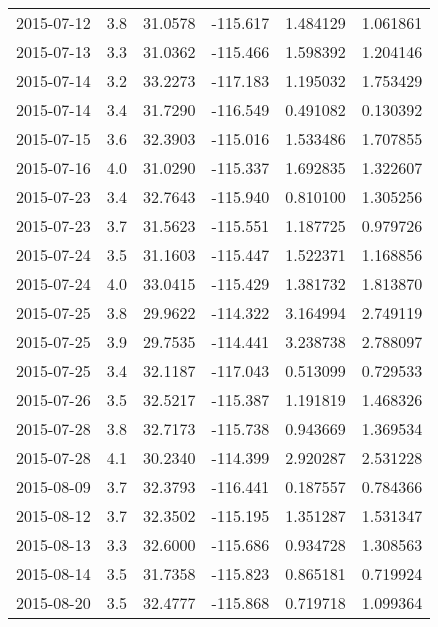 \begin{tabular}{lrrrrr}
2015-07-12 &       3.8 &  31.0578 &  -115.617 &         1.484129 &         1.061861 \\
2015-07-13 &       3.3 &  31.0362 &  -115.466 &         1.598392 &         1.204146 \\
2015-07-14 &       3.2 &  33.2273 &  -117.183 &         1.195032 &         1.753429 \\
2015-07-14 &       3.4 &  31.7290 &  -116.549 &         0.491082 &         0.130392 \\
2015-07-15 &       3.6 &  32.3903 &  -115.016 &         1.533486 &         1.707855 \\
2015-07-16 &       4.0 &  31.0290 &  -115.337 &         1.692835 &         1.322607 \\
2015-07-23 &       3.4 &  32.7643 &  -115.940 &         0.810100 &         1.305256 \\
2015-07-23 &       3.7 &  31.5623 &  -115.551 &         1.187725 &         0.979726 \\
2015-07-24 &       3.5 &  31.1603 &  -115.447 &         1.522371 &         1.168856 \\
2015-07-24 &       4.0 &  33.0415 &  -115.429 &         1.381732 &         1.813870 \\
2015-07-25 &       3.8 &  29.9622 &  -114.322 &         3.164994 &         2.749119 \\
2015-07-25 &       3.9 &  29.7535 &  -114.441 &         3.238738 &         2.788097 \\
2015-07-25 &       3.4 &  32.1187 &  -117.043 &         0.513099 &         0.729533 \\
2015-07-26 &       3.5 &  32.5217 &  -115.387 &         1.191819 &         1.468326 \\
2015-07-28 &       3.8 &  32.7173 &  -115.738 &         0.943669 &         1.369534 \\
2015-07-28 &       4.1 &  30.2340 &  -114.399 &         2.920287 &         2.531228 \\
2015-08-09 &       3.7 &  32.3793 &  -116.441 &         0.187557 &         0.784366 \\
2015-08-12 &       3.7 &  32.3502 &  -115.195 &         1.351287 &         1.531347 \\
2015-08-13 &       3.3 &  32.6000 &  -115.686 &         0.934728 &         1.308563 \\
2015-08-14 &       3.5 &  31.7358 &  -115.823 &         0.865181 &         0.719924 \\
2015-08-20 &       3.5 &  32.4777 &  -115.868 &         0.719718 &         1.099364 \\

\end{tabular}
